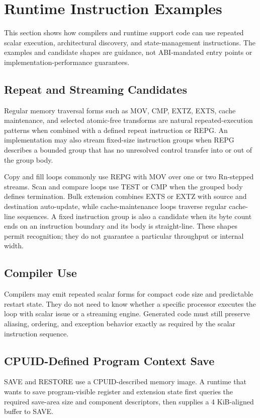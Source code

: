 \clearpage
\section{Runtime Instruction Examples}

This section shows how compilers and runtime support code can use repeated scalar execution, architectural discovery,
and state-management instructions. The examples and candidate shapes are guidance, not ABI-mandated entry points or
implementation-performance guarantees.

\subsection{Repeat and Streaming Candidates}
Regular memory traversal forms such as MOV, CMP, EXTZ, EXTS, cache maintenance, and selected atomic-free
transforms are natural repeated-execution patterns when combined with a defined repeat instruction or REPG. An implementation may also stream
fixed-size instruction groups when REPG describes a bounded group that has no unresolved control transfer into or
out of the group body.

Copy and fill loops commonly use REPG with MOV over one or two Rn-stepped streams. Scan and compare loops use TEST or
CMP when the grouped body defines termination. Bulk extension combines EXTS or EXTZ with source and destination
auto-update, while cache-maintenance loops traverse regular cache-line sequences. A fixed instruction group is also a
candidate when its byte count ends on an instruction boundary and its body is straight-line. These shapes permit
recognition; they do not guarantee a particular throughput or internal width.

\subsection{Compiler Use}
Compilers may emit repeated scalar forms for compact code size and predictable restart state. They do not need to
know whether a specific processor executes the loop with scalar issue or a streaming engine. Generated code must
still preserve aliasing, ordering, and exception behavior exactly as required by the scalar instruction sequence.

\subsection{CPUID-Defined Program Context Save}
SAVE and RESTORE use a CPUID-described memory image. A runtime that wants to save program-visible register and
extension state first queries the required save-area size and component descriptors, then supplies a
4 KiB-aligned buffer to SAVE.

